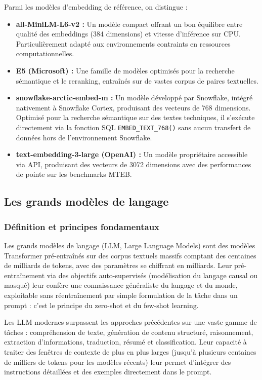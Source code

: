 Parmi les modèles d'embedding de référence, on distingue :
\begin{itemize}
    \item \textbf{all-MiniLM-L6-v2 \cite{logo:sentence_transformers} :} Un modèle compact offrant un bon équilibre entre qualité des embeddings (384 dimensions) et vitesse d'inférence sur CPU. Particulièrement adapté aux environnements contraints en ressources computationnelles.
    \item \textbf{E5 (Microsoft) \cite{logo:e5} :} Une famille de modèles optimisés pour la recherche sémantique et le reranking, entraînés sur de vastes corpus de paires textuelles.
    \item \textbf{snowflake-arctic-embed-m \cite{logo:snowflake_cortex} :} Un modèle développé par Snowflake, intégré nativement à Snowflake Cortex, produisant des vecteurs de 768 dimensions. Optimisé pour la recherche sémantique sur des textes techniques, il s'exécute directement via la fonction SQL \texttt{EMBED\_TEXT\_768()} sans aucun transfert de données hors de l'environnement Snowflake.
    \item \textbf{text-embedding-3-large (OpenAI) \cite{logo:openai} :} Un modèle propriétaire accessible via API, produisant des vecteurs de 3072 dimensions avec des performances de pointe sur les benchmarks MTEB.
\end{itemize}

\subsection{Les grands modèles de langage}

\subsubsection{Définition et principes fondamentaux}

Les grands modèles de langage (LLM, Large Language Models) sont des modèles Transformer pré-entraînés sur des corpus textuels massifs comptant des centaines de milliards de tokens, avec des paramètres se chiffrant en milliards. Leur pré-entraînement via des objectifs auto-supervisés (modélisation du langage causal ou masqué) leur confère une connaissance généraliste du langage et du monde, exploitable sans réentraînement par simple formulation de la tâche dans un prompt : c'est le principe du zero-shot et du few-shot learning.

Les LLM modernes surpassent les approches précédentes sur une vaste gamme de tâches : compréhension de texte, génération de contenu structuré, raisonnement, extraction d'informations, traduction, résumé et classification. Leur capacité à traiter des fenêtres de contexte de plus en plus larges (jusqu'à plusieurs centaines de milliers de tokens pour les modèles récents) leur permet d'intégrer des instructions détaillées et des exemples directement dans le prompt.

